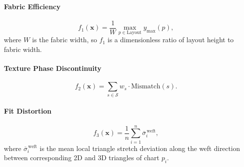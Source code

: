 \documentclass[runningheads]{llncs}
\begin{document}
\paragraph{Fabric Efficiency}

\[
f_1(\mathbf{x}) =
\frac{1}{W}\max_{p \in \text{Layout}} y_{\max}(p),
\]
where $W$ is the fabric width, so $f_1$ is a dimensionless ratio of
layout height to fabric width.

\paragraph{Texture Phase Discontinuity}

\[
f_2(\mathbf{x}) =
\sum_{s \in \mathcal{S}}
w_s \cdot \mathrm{Mismatch}(s).
\]

\paragraph{Fit Distortion}

\[
f_3(\mathbf{x}) =
\frac{1}{n} \sum_{i=1}^n \overline{\sigma}_i^{\,\mathrm{weft}},
\]
where $\overline{\sigma}_i^{\,\mathrm{weft}}$ is the mean local triangle stretch deviation
along the weft direction between corresponding 2D and 3D triangles of chart $p_i$.
\end{document}
